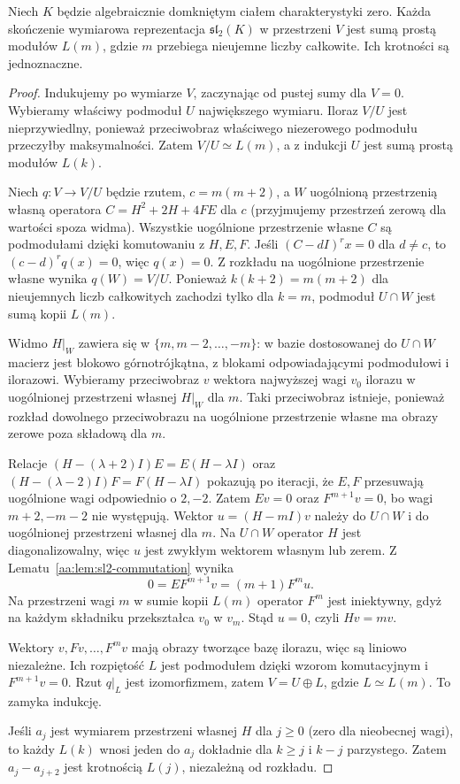 \begin{twierdzenie}
\label{aa:tw:sl2-complete-reducibility}
Niech $K$ będzie algebraicznie domkniętym ciałem charakterystyki zero. Każda skończenie wymiarowa reprezentacja $\mathfrak{sl}_2(K)$ w przestrzeni $V$ jest sumą prostą modułów $L(m)$, gdzie $m$ przebiega nieujemne liczby całkowite. Ich krotności są jednoznaczne.
\end{twierdzenie}
\begin{proof}
Indukujemy po wymiarze $V$, zaczynając od pustej sumy dla $V=0$. Wybieramy właściwy podmoduł $U$ największego wymiaru. Iloraz $V/U$ jest nieprzywiedlny, ponieważ przeciwobraz właściwego niezerowego podmodułu przeczyłby maksymalności. Zatem $V/U\simeq L(m)$, a z indukcji $U$ jest sumą prostą modułów $L(k)$.

Niech $q:V\to V/U$ będzie rzutem, $c=m(m+2)$, a $W$ uogólnioną przestrzenią własną operatora $C=H^2+2H+4FE$ dla $c$ (przyjmujemy przestrzeń zerową dla wartości spoza widma). Wszystkie uogólnione przestrzenie własne $C$ są podmodułami dzięki komutowaniu z $H,E,F$. Jeśli $(C-dI)^rx=0$ dla $d\ne c$, to $(c-d)^rq(x)=0$, więc $q(x)=0$. Z rozkładu na uogólnione przestrzenie własne wynika $q(W)=V/U$. Ponieważ $k(k+2)=m(m+2)$ dla nieujemnych liczb całkowitych zachodzi tylko dla $k=m$, podmoduł $U\cap W$ jest sumą kopii $L(m)$.

Widmo $H|_W$ zawiera się w $\{m,m-2,\ldots,-m\}$: w bazie dostosowanej do $U\cap W$ macierz jest blokowo górnotrójkątna, z blokami odpowiadającymi podmodułowi i ilorazowi. Wybieramy przeciwobraz $v$ wektora najwyższej wagi $v_0$ ilorazu w uogólnionej przestrzeni własnej $H|_W$ dla $m$. Taki przeciwobraz istnieje, ponieważ rozkład dowolnego przeciwobrazu na uogólnione przestrzenie własne ma obrazy zerowe poza składową dla $m$.

Relacje $(H-(\lambda+2)I)E=E(H-\lambda I)$ oraz $(H-(\lambda-2)I)F=F(H-\lambda I)$ pokazują po iteracji, że $E,F$ przesuwają uogólnione wagi odpowiednio o $2,-2$. Zatem $Ev=0$ oraz $F^{m+1}v=0$, bo wagi $m+2,-m-2$ nie występują. Wektor $u=(H-mI)v$ należy do $U\cap W$ i do uogólnionej przestrzeni własnej dla $m$. Na $U\cap W$ operator $H$ jest diagonalizowalny, więc $u$ jest zwykłym wektorem własnym lub zerem. Z Lematu~\ref{aa:lem:sl2-commutation} wynika
\[
 0=EF^{m+1}v=(m+1)F^mu.
\]
Na przestrzeni wagi $m$ w sumie kopii $L(m)$ operator $F^m$ jest iniektywny, gdyż na każdym składniku przekształca $v_0$ w $v_m$. Stąd $u=0$, czyli $Hv=mv$.

Wektory $v,Fv,\ldots,F^mv$ mają obrazy tworzące bazę ilorazu, więc są liniowo niezależne. Ich rozpiętość $L$ jest podmodułem dzięki wzorom komutacyjnym i $F^{m+1}v=0$. Rzut $q|_L$ jest izomorfizmem, zatem $V=U\oplus L$, gdzie $L\simeq L(m)$. To zamyka indukcję.

Jeśli $a_j$ jest wymiarem przestrzeni własnej $H$ dla $j\ge0$ (zero dla nieobecnej wagi), to każdy $L(k)$ wnosi jeden do $a_j$ dokładnie dla $k\ge j$ i $k-j$ parzystego. Zatem $a_j-a_{j+2}$ jest krotnością $L(j)$, niezależną od rozkładu.
\end{proof}

